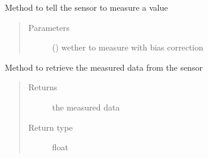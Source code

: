 \documentclass[letterpaper,10pt,english]{sphinxmanual}
\begin{document}
\begin{fulllineitems}
\begin{fulllineitems}
\begin{quote}
\begin{description}
\end{description}\end{quote}

\end{fulllineitems}


\begin{fulllineitems}
\label{\detokenize{sensor:lib.sensor.SensorInterface.measure}}
Method to tell the sensor to measure a value
\begin{quote}\begin{description}
\item[{Parameters}] \leavevmode
{} () \textendash{} wether to measure with bias correction

\end{description}\end{quote}

\end{fulllineitems}


\begin{fulllineitems}
\label{\detokenize{sensor:lib.sensor.SensorInterface.read_measurements}}
Method to retrieve the measured data from the sensor
\begin{quote}\begin{description}
\item[{Returns}] \leavevmode
the measured data

\item[{Return type}] \leavevmode
float

\end{description}\end{quote}

\end{fulllineitems}


\end{fulllineitems}
\end{document}
